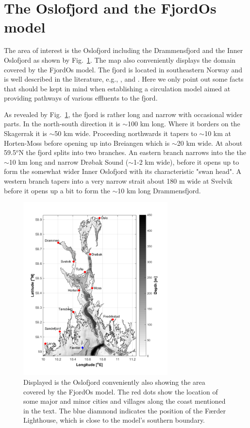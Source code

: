 \section{The Oslofjord and the FjordOs model}
The area of interest is the Oslofjord including the Drammensfjord and the Inner Oslofjord as shown by Fig.~\ref{fig:kart}. The map also conveniently displays the domain covered by the FjordOs model. The fjord is located in southeastern Norway and is well described in the literature, e.g., \cite{baalsrud:2002}, \cite{roed:etal:2016} and \cite{hjelm:etal:2017}. Here we only point out some facts that should be kept in mind when establishing a circulation model aimed at providing pathways of various effluents to the fjord.

As revealed by Fig.~\ref{fig:kart}, the fjord is rather long and narrow with occasional wider parts. In the north-south direction it is $\sim$100 km long. Where it borders on the Skagerrak it is $\sim$50 km wide. Proceeding northwards it tapers to $\sim$10 km at Horten-Moss before opening up into Breiangen which is $\sim$20 km wide. At about 59.5$^o$N the fjord splits into two branches. An eastern branch narrows into the the $\sim$10 km long and narrow Dr{\o}bak Sound ($\sim$1-2 km wide), before it opens up to form the somewhat wider Inner Oslofjord with its characteristic "swan head". A western branch tapers into a very narrow strait about 180 m wide at Svelvik before it opens up a bit to form the $\sim$10 km long Drammensfjord.


\begin{figure}[htb]
\centerline{
\includegraphics*[trim=0cm 0.9cm 0cm 0cm,clip=true,width=0.7\textwidth]{Figurer/kart}
}
\caption{\small
Displayed is the Oslofjord conveniently also showing the area covered by the FjordOs model. The red dots show the location of some major and minor cities and villages along the coast mentioned in the text. The blue diamnond indicates the position of the F{\ae}rder Lighthouse, which is close to the model's southern boundary.
}
\label{fig:kart}
\end{figure}

